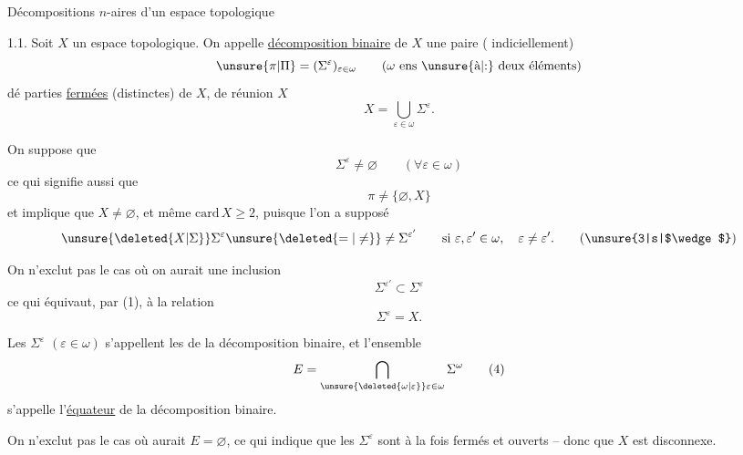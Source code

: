 \begingroup
\makeatletter\tagsleft@true\makeatother

\noindent Décompositions $n$-aires d'un espace topologique

1.1. Soit $X$ un espace topologique. On appelle \uline{décomposition binaire}
de $X$ une paire ( indiciellement)
\[
\unsure{\pi|\Pi}=(\Sigma^\varepsilon)_{\varepsilon\in\omega}
\qquad(\omega\ \text{ens \unsure{à|:} deux éléments})
\]
dé  parties \uline{fermées} (distinctes) de $X$,
de réunion $X$
\[
X=\bigcup_{\varepsilon\in\omega}\Sigma^\varepsilon.\tag*{(1)}
\]

On suppose que
\[
\Sigma^\varepsilon\ne\varnothing\qquad(\forall\varepsilon\in\omega)\tag*{(2)}
\]
ce qui signifie aussi que
\[
\pi\ne\{\varnothing,X\}\tag*{$(2')$}
\]
et implique que $X\ne\varnothing$, et même $\mathrm{card}\,X\geq 2$,
puisque l'on a supposé
\[
\unsure{\deleted{X|\Sigma}}\Sigma^\varepsilon
\unsure{\deleted{=|\ne}}\ne\Sigma^{\varepsilon'}
\qquad\text{si }\varepsilon,\varepsilon'\in\omega,\quad
\varepsilon\ne\varepsilon'.\tag*{(\unsure{3|s|$\wedge$})}
\]

On n'exclut pas le cas où on aurait une inclusion
\[
\Sigma^{\varepsilon'}\subset\Sigma^\varepsilon
\]
ce qui équivaut, par (1), à la relation
\[
\Sigma^\varepsilon=X.
\]

Les $\Sigma^\varepsilon$ $(\varepsilon\in\omega)$ s'appellent les
\uline{} de la décomposition binaire,
 et l'ensemble
\[
E=\bigcap_{\unsure{\deleted{\omega|\varepsilon}}\varepsilon\in\omega}
\Sigma^\omega\tag*{(4)}
\]
s'appelle l'\uline{équateur} de la décomposition binaire.

On n'exclut pas le cas où  aurait $E=\varnothing$,
ce qui indique que les $\Sigma^\varepsilon$ \inserted{$(\varepsilon\in\omega)$}
sont  à la fois
fermés et ouverts -- donc que $X$ est disconnexe.
\endgroup
